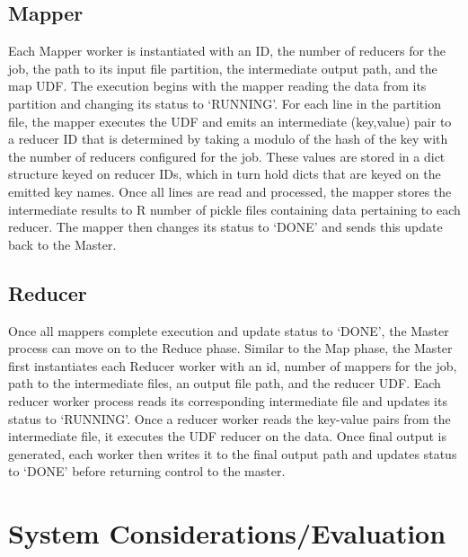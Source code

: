\documentclass[a4paper,12pt]{article}
\begin{document}
\subsection{Mapper}
Each Mapper worker is instantiated with an ID, the number of reducers for the job, the path to its input file partition, the intermediate output path, and the map UDF. The execution begins with the mapper reading the data from its partition and changing its status to `RUNNING'. For each line in the partition file, the mapper executes the UDF and emits an intermediate (key,value) pair to a reducer ID that is determined by taking a modulo of the hash of the key with the number of reducers configured for the job. These values are stored in a dict structure keyed on reducer IDs, which in turn hold dicts that are keyed on the emitted key names. Once all lines are read and processed, the mapper stores the intermediate results to R number of pickle files containing data pertaining to each reducer. The mapper then changes its status to `DONE' and sends this update back to the Master.

\subsection{Reducer}
Once all mappers complete execution and update status to `DONE', the Master process can move on to the Reduce phase. Similar to the Map phase, the Master first instantiates each Reducer worker with an id, number of mappers for the job, path to the intermediate files, an output file path, and the reducer UDF. Each reducer worker process reads its corresponding intermediate file and updates its status to `RUNNING'. Once a reducer worker reads the key-value pairs from the intermediate file, it executes the UDF reducer on the data. Once final output is generated, each worker then writes it to the final output path and updates status to `DONE' before returning control to the master.

\section{System Considerations/Evaluation}
\end{document}
